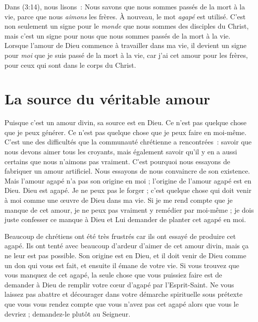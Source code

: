 Dans (3:14), nous lisons~:
 \og Nous savons que nous sommes passés de la mort à la vie,
 parce que nous \emph{aimons} les frères. \fg{}
 À nouveau, le mot \emph{agapé} est utilisé.
 C'est non seulement un signe pour le \emph{monde}
 que nous sommes des disciples du Christ, mais c'est un signe pour nous
 que nous sommes passés de la mort à la vie.
 Lorsque l'amour de Dieu commence à travailler dans ma vie,
 il devient un signe pour \emph{moi} que je suis passé de la mort à la vie,
 car j'ai cet amour pour les frères, pour ceux qui sont
 dans le corps du Christ.


\section*{La source du véritable amour}

Puisque c'est un amour divin, sa source est en Dieu.
 Ce n'est pas quelque chose que je peux générer.
 Ce n'est pas quelque chose que je peux faire en moi-même.
 C'est une des difficultés que la communauté chrétienne a rencontrées~:
 savoir que nous devons aimer tous les croyants, mais également savoir
 qu'il y en a aussi certains que nous n'aimons pas vraiment.
 C'est pourquoi nous essayons de fabriquer un amour artificiel.
 Nous essayons de nous convaincre de son existence.
 Mais l'amour agapé n'a pas son origine en moi ;
 l'origine de l'amour agapé est en Dieu. Dieu est agapé.
 Je ne peux pas le forger ; c'est quelque chose qui doit venir à moi
 comme une œuvre de Dieu dans ma vie.
 Si je me rend compte que je manque de cet amour, je ne peux pas vraiment
 y remédier par moi-même ; je dois juste confesser ce manque à Dieu
 et Lui demander de planter cet agapé en moi.

Beaucoup de chrétiens ont été très frustrés car ils ont essayé
 de produire cet agapé.
 Ils ont tenté avec beaucoup d'ardeur d'aimer de cet amour divin,
 mais ça ne leur est pas possible. Son origine est en Dieu,
 et il doit venir de Dieu comme un don qui vous est fait,
 et ensuite il émane de votre vie. Si vous trouvez que vous manquez
 de cet agapé, la seule chose que vous puissiez faire est de demander à Dieu
 de remplir votre cœur d'agapé par l'Esprit-Saint.
 Ne vous laissez pas abattre et décourager
 dans votre démarche spirituelle
 sous prétexte que vous vous rendez compte que vous n'avez pas
 cet agapé alors que vous le devriez ;
 demandez-le plutôt au Seigneur.
\closechapter

